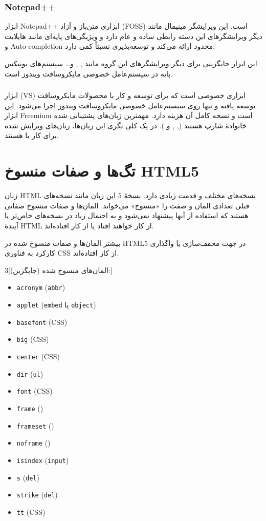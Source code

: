 \documentclass[a4paper]{article}
\begin{document}
\subsubsection*{Notepad++}
ابزار Notepad++ ابزاری متن‌باز و آزاد (FOSS) است. این ویرایشگر مینیمال مانند دیگر
ویرایشگرهای این دسته رابطی ساده و عام دارد و ویژیگی‌های پایه‌ای مانند هایلایت و
Auto-completion محدود ارائه می‌کند و توسعه‌پذیری نسبتاً کمی دارد.

این ابزار جایگزینی برای دیگر ویرایشگرهای این گروه مانند , ,  و\ldots{} سیستم‌های یونیکس پایه در سیستم‌عامل خصوصی مایکروسافت ویندوز است.

\subsubsection{}
ابزار  (VS) ابزاری خصوصی است که برای
توسعه و کار با محصولات مایکروسافت توسعه یافته و تنها روی سیستم‌عامل خصوصی
مایکروسافت ویندوز اجرا می‌شود. این ابزار Freemium است و نسخه کامل آن هزینه دارد.
مهمترین زبان‌های پشتیبانی شده خانوادهٔ شارپ هستند (, ,  و ).
در یک کلی نگری این زبان‌ها، زبان‌های ویرایش شده برای کار با  هستند.\cite{wp:vs}

\section{تگ‌ها و صفات منسوخ HTML5}
زبان HTML نسخه‌های مختلف و قدمت زیادی دارد. نسخهٔ $5$ این زبان مانند نسخه‌های قبلی
تعدادی المان و صفت را «منسوخ» می‌خواند. المان‌ها و صفات منسوخ
صفاتی هستند که استفاده از آنها پیشنهاد نمی‌شود و به احتمال زیاد در نسخه‌های خاص‌تر یا
آیندهٔ HTML از کار خواهند افتاد یا از کار افتاده‌اند.

بیشتر المان‌ها و صفات منسوخ شده در HTML5 در جهت مخفف‌سازی یا واگذاری کارکرد به
فناوری CSS از کار افتاده‌اند.


\newcommand{\dep}[2][CSS]{\item \texttt{#2} (#1)}
\begin{multicols}{3}[المان‌های منسوخ شده (جایگزین)\cite{w3:tags, tp:dep_tags}:]
  \begin{itemize}
    \dep[\texttt{abbr}]{acronym}
    \dep[\texttt{embed} یا \texttt{object}]{applet}
    \dep{basefont}
    \dep{big}
    \dep{center}
    \dep[\texttt{ul}]{dir}
    \dep{font}
    \dep[]{frame}
    \dep[]{frameset}
    \dep[\rl{حذف شده}]{noframe}
    \dep[\texttt{input}]{isindex}
    \dep[\texttt{del}]{s}
    \dep[\texttt{del}]{strike}
    \dep{tt}
  \end{itemize}
\end{multicols}
\end{document}

